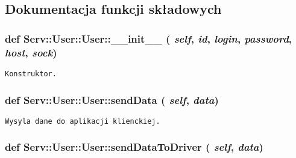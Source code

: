 \subsection{Dokumentacja funkcji składowych}
\hypertarget{class_serv_1_1_user_1_1_user_e503b7d48b7eb7c8a399f2652a3ff002}{
\subsubsection[{\_\-\_\-init\_\-\_\-}]{\setlength{\rightskip}{0pt plus 5cm}def Serv::User::User::\_\-\_\-init\_\-\_\- ( {\em self}, \/   {\em id}, \/   {\em login}, \/   {\em password}, \/   {\em host}, \/   {\em sock})}}
\label{class_serv_1_1_user_1_1_user_e503b7d48b7eb7c8a399f2652a3ff002}




\footnotesize\begin{verbatim}Konstruktor.\end{verbatim}
\normalsize
 \hypertarget{class_serv_1_1_user_1_1_user_2d0441db55283b641079acb8bf67c30a}{
\subsubsection[{sendData}]{\setlength{\rightskip}{0pt plus 5cm}def Serv::User::User::sendData ( {\em self}, \/   {\em data})}}
\label{class_serv_1_1_user_1_1_user_2d0441db55283b641079acb8bf67c30a}




\footnotesize\begin{verbatim}Wysyla dane do aplikacji klienckiej.\end{verbatim}
\normalsize
 \hypertarget{class_serv_1_1_user_1_1_user_0907f262b618e5b6c05c6e3584e24b44}{
\subsubsection[{sendDataToDriver}]{\setlength{\rightskip}{0pt plus 5cm}def Serv::User::User::sendDataToDriver ( {\em self}, \/   {\em data})}}
\label{class_serv_1_1_user_1_1_user_0907f262b618e5b6c05c6e3584e24b44}




